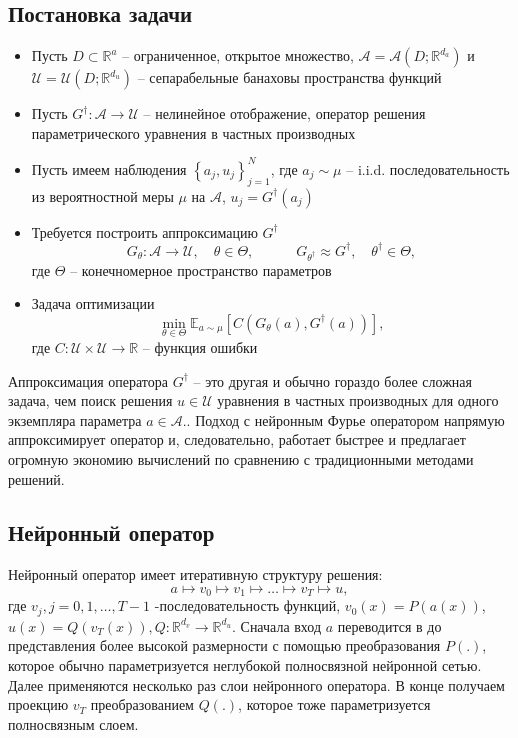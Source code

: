 \subsection{Постановка задачи}
	\begin{itemize}
		\item Пусть $D \subset \mathbb{R}^{a}$ -- ограниченное, открытое множество, $\mathcal{A}=\mathcal{A}\left(D ; \mathbb{R}^{d_{a}}\right)$ и $\mathcal{U}=\mathcal{U}\left(D ; \mathbb{R}^{d_{u}}\right)$ -- сепарабельные банаховы пространства функций
		\item Пусть $G^{\dagger}: \mathcal{A} \rightarrow \mathcal{U}$ -- нелинейное отображение, оператор решения параметрического уравнения в частных производных
		\item Пусть имеем наблюдения $\left\{a_{j}, u_{j}\right\}_{j=1}^{N}$, где $a_{j} \sim \mu$ -- i.i.d. последовательность из вероятностной меры $\mu$ на $\mathcal{A}$, $u_{j}=G^{\dagger}\left(a_{j}\right)$ 
		\item Требуется построить аппроксимацию $G^{\dagger}$
		$$
		G_{\theta}: \mathcal{A} \rightarrow \mathcal{U}, \quad \theta \in \Theta, \quad \quad \quad G_{\theta^{\dagger}} \approx G^{\dagger}, \quad \theta^{\dagger} \in \Theta
		,$$
		где $\Theta$ -- конечномерное пространство параметров
		\item Задача оптимизации
		$$
		\min_{\theta \in \Theta} \mathbb{E}_{a \sim \mu}\left[C\left(G_{\theta}(a), G^{\dagger}(a)\right)\right]
		,$$
		где $C: \mathcal{U} \times \mathcal{U} \rightarrow \mathbb{R}$ -- функция ошибки
	\end{itemize}

Аппроксимация оператора $G^{\dagger}$ -- это другая и обычно гораздо более сложная задача, чем поиск решения $u \in \mathcal{U}$ уравнения в частных производных для одного экземпляра параметра $a \in \mathcal{A} .$. Подход с нейронным Фурье оператором напрямую аппроксимирует оператор и, следовательно, работает быстрее и предлагает огромную экономию вычислений по сравнению с традиционными методами решений.

\subsection{Нейронный оператор}
Нейронный оператор имеет итеративную структуру решения:
$$a\mapsto v_{0} \mapsto v_{1} \mapsto \ldots \mapsto v_{T} \mapsto u,$$
где $v_{j}, j=0,1, \ldots, T-1$ -последовательность функций, $v_{0}(x)=P(a(x))$,  $u(x)=Q\left(v_{T}(x)\right), Q: \mathbb{R}^{d_{v}} \rightarrow \mathbb{R}^{d_{u}}$. Сначала вход $a$ переводится в до представления более высокой размерности с помощью преобразования $P(.)$, которое обычно параметризуется неглубокой полносвязной нейронной сетью. Далее применяются несколько раз слои нейронного оператора. В конце получаем проекцию $v_T$ преобразованием $Q(.)$, которое тоже параметризуется полносвязным слоем.

